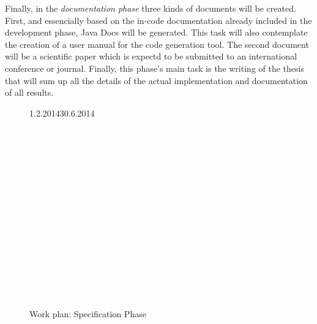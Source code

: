 Finally, in the \emph{documentation phase} three kinds of documents will be created. First, and essencially based on the in-code documentation already included in the development phase, Java Docs will be generated. This task will also contemplate the creation of a user manual for the code generation tool. The second document will be a scientific paper which is expectd to be submitted to an international conference or journal. Finally, this phase's main task is the writing of the thesis that will sum up all the details of the actual implementation and documentation of all results.

\begin{figure}[h]
	\caption{Work plan: Specification Phase}
	\label{dia:gantt}
	\begin{ganttchart}[
		x unit=0.004\textwidth,
		time slot format=little-endian
		]{1.2.2014}{30.6.2014}
		 \\
		 \\

		 \\
		 \\
		 \\
		 \\
		 \\

		 \\
		 \\
		 \\
		 \\
		 \\

		 \\
		 \\
		 \\
		 \\
	\end{ganttchart}
\end{figure}

